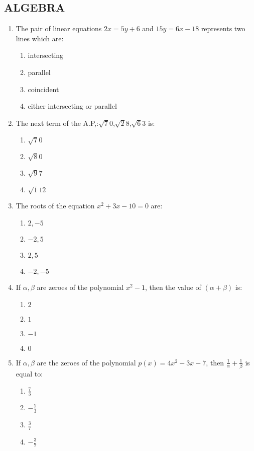 \documentclass[12pt,-letter paper]{article}
\providecommand{\brak}[1]{\ensuremath{\left(#1\right)}}
\begin{document}
\begin{center}
\section*{ALGEBRA}
\end{center}
\begin{enumerate}
    \item The pair of linear equations $2x = 5y + 6$ and $15y = 6x - 18$ represents two lines which are:
    \begin{enumerate}
        \item intersecting
        \item parallel
        \item coincident
        \item either intersecting or parallel
    \end{enumerate}
    \item The next term of the A.P,:$\sqrt 70$,$\sqrt 28$,$\sqrt 63$ is:
	\begin{enumerate}
        \item $\sqrt 70$
	\item $\sqrt 80$
	\item $\sqrt 97$
	\item $\sqrt 112$
\end{enumerate}
\item The roots of the equation $x^2 + 3x - 10 = 0$ are:

\begin{enumerate}
    \item$2, -5$
    \item $-2, 5$
    \item $2, 5$
    \item $-2, -5$
\end{enumerate}
\item If $\alpha, \beta$ are zeroes of the polynomial $x^2 - 1$, then the value of $\brak{\alpha + \beta}$ is:

\begin{enumerate}
    \item $2$
    \item $1$
    \item $-1$
    \item $0$
\end{enumerate}
\item If $ \alpha, \beta $ are the zeroes of the polynomial $ p\brak{x} = 4x^2 - 3x - 7 $, then $ \frac{1}{\alpha} + \frac{1}{\beta} $ is equal to:

\begin{enumerate}
    \item $\frac{7}{3}$
    \item$-\frac{7}{3}$
    \item $\frac{3}{7}$
    \item $-\frac{3}{7}$
\end{enumerate}
\begin{center}

\end{center}
\end{enumerate}
\end{document}

